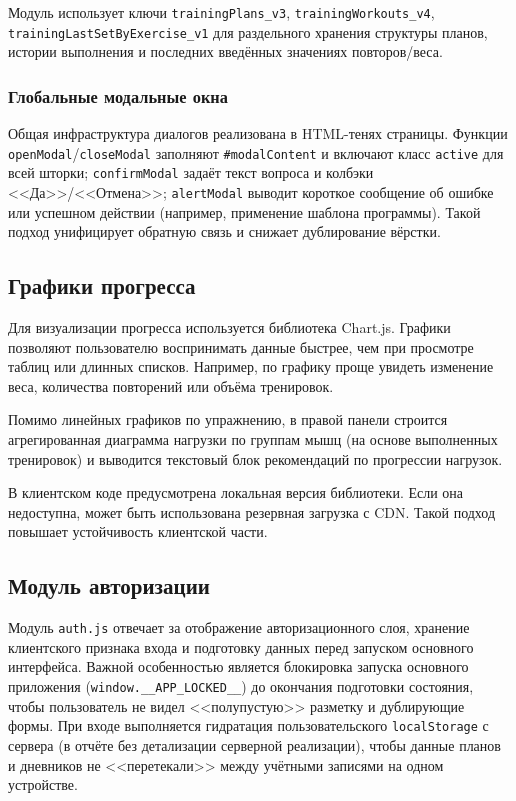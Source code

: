 Модуль использует ключи \texttt{trainingPlans\_v3}, \texttt{trainingWorkouts\_v4}, \texttt{trainingLastSetByExercise\_v1} для раздельного хранения структуры планов, истории выполнения и последних введённых значениях повторов/веса.

\subsubsection{Глобальные модальные окна}

Общая инфраструктура диалогов реализована в HTML-тенях страницы. Функции \texttt{openModal}/\texttt{closeModal} заполняют \texttt{\#modalContent} и включают класс \texttt{active} для всей шторки; \texttt{confirmModal} задаёт текст вопроса и колбэки <<Да>>/<<Отмена>>; \texttt{alertModal} выводит короткое сообщение об ошибке или успешном действии (например, применение шаблона программы). Такой подход унифицирует обратную связь и снижает дублирование вёрстки.

\subsection{Графики прогресса}

Для визуализации прогресса используется библиотека Chart.js. Графики позволяют пользователю воспринимать данные быстрее, чем при просмотре таблиц или длинных списков. Например, по графику проще увидеть изменение веса, количества повторений или объёма тренировок.

Помимо линейных графиков по упражнению, в правой панели строится агрегированная диаграмма нагрузки по группам мышц (на основе выполненных тренировок) и выводится текстовый блок рекомендаций по прогрессии нагрузок.

В клиентском коде предусмотрена локальная версия библиотеки. Если она недоступна, может быть использована резервная загрузка с CDN. Такой подход повышает устойчивость клиентской части.

\subsection{Модуль авторизации}

Модуль \texttt{auth.js} отвечает за отображение авторизационного слоя, хранение клиентского признака входа и подготовку данных перед запуском основного интерфейса. Важной особенностью является блокировка запуска основного приложения (\texttt{window.\_\_APP\_LOCKED\_\_}) до окончания подготовки состояния, чтобы пользователь не видел <<полупустую>> разметку и дублирующие формы. При входе выполняется гидратация пользовательского \texttt{localStorage} с сервера (в отчёте без детализации серверной реализации), чтобы данные планов и дневников не <<перетекали>> между учётными записями на одном устройстве.

